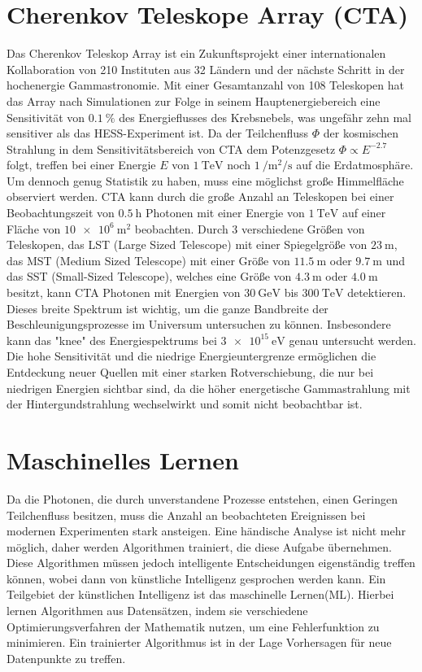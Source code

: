 \section{Cherenkov Teleskope Array (CTA)}

Das Cherenkov Teleskop Array ist ein Zukunftsprojekt einer internationalen Kollaboration von 210 Instituten aus 32 Ländern\cite{CTA_consortium}
und der nächste Schritt in der hochenergie Gammastronomie.
Mit einer Gesamtanzahl von 108 Teleskopen hat das Array nach Simulationen zur Folge in seinem Hauptenergiebereich eine Sensitivität von $\SI{0.1}{\percent}$
des Energieflusses des Krebsnebels, was ungefähr zehn mal sensitiver als das HESS-Experiment ist\cite{CTA_paper}.
Da der Teilchenfluss $\Phi$ der kosmischen Strahlung in dem Sensitivitätsbereich von CTA dem Potenzgesetz $\Phi \propto E^{-2.7}$\cite[5]{Cosmic_rays} folgt,
treffen bei einer Energie $E$ von $\SI{1}{\tera\eV}$ noch $\SI{1}{\per\m\squared\per\s}$ auf die Erdatmosphäre.
Um dennoch genug Statistik zu haben, muss eine möglichst große Himmelfläche observiert werden.
CTA kann durch die große Anzahl an Teleskopen bei einer Beobachtungszeit von $\SI{0.5}{\hour}$ Photonen mit einer Energie von $\SI{1}{\tera\eV}$ auf einer
Fläche von $\SI{10e6}{\m\squared}$\cite{CTA_ob} beobachten.
Durch 3 verschiedene Größen von Teleskopen, das LST (Large Sized Telescope) mit einer Spiegelgröße von $\SI{23}{\m}$, das MST (Medium Sized Telescope)
mit einer Größe von $\SI{11.5}{\m}$ oder $\SI{9.7}{\m}$ und das SST (Small-Sized Telescope), welches eine Größe von $\SI{4.3}{\m}$ oder $\SI{4.0}{\m}$
besitzt, kann CTA Photonen mit Energien von $\SI{30}{\giga\eV}$ bis $\SI{300}{\tera\eV}$ detektieren.
Dieses breite Spektrum ist wichtig, um die ganze Bandbreite der Beschleunigungsprozesse im Universum untersuchen zu können.
Insbesondere kann das "knee" des Energiespektrums bei $\SI{3e15}{\eV}$ genau untersucht werden.
Die hohe Sensitivität und die niedrige Energieuntergrenze ermöglichen die Entdeckung neuer Quellen mit einer starken Rotverschiebung, die nur bei niedrigen
Energien sichtbar sind, da die höher energetische Gammastrahlung mit der Hintergundstrahlung wechselwirkt und somit nicht beobachtbar ist.

\section{Maschinelles Lernen}

Da die Photonen, die durch unverstandene Prozesse entstehen, einen Geringen Teilchenfluss besitzen, muss die Anzahl an beobachteten Ereignissen bei modernen
Experimenten stark ansteigen.
Eine händische Analyse ist nicht mehr möglich, daher werden Algorithmen trainiert,
die diese Aufgabe übernehmen. Diese Algorithmen müssen jedoch intelligente Entscheidungen eigenständig treffen können, wobei dann von künstliche Intelligenz
gesprochen werden kann.
Ein Teilgebiet der künstlichen Intelligenz ist das maschinelle Lernen(ML). Hierbei lernen Algorithmen aus Datensätzen, indem sie verschiedene Optimierungsverfahren
der Mathematik nutzen, um eine Fehlerfunktion zu minimieren. Ein trainierter Algorithmus ist in der Lage Vorhersagen für neue Datenpunkte zu treffen.

